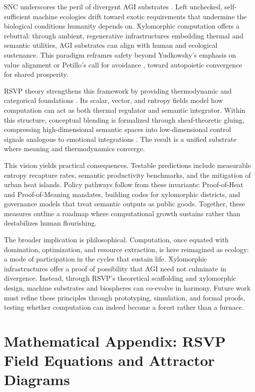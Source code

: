 \documentclass[12pt]{article}
\begin{document}
SNC underscores the peril of divergent AGI substrates \citep{Petillo2024}. Left unchecked, self-sufficient machine ecologies drift toward exotic requirements that undermine the biological conditions humanity depends on. Xylomorphic computation offers a rebuttal: through ambient, regenerative infrastructures embedding thermal and semantic utilities, AGI substrates can align with human and ecological sustenance. This paradigm reframes safety beyond Yudkowsky's emphasis on value alignment \citep{Yudkowsky2004} or Petillo's call for avoidance \citep{Petillo2024}, toward autopoietic convergence for shared prosperity.

RSVP theory strengthens this framework by providing thermodynamic and categorical foundations \citep{Jacobson1995,Padmanabhan2010,Verlinde2011,MacLaneMoerdijk1992,Lurie2009}. Its scalar, vector, and entropy fields model how computation can act as both thermal regulator and semantic integrator. Within this structure, conceptual blending is formalized through sheaf-theoretic gluing, compressing high-dimensional semantic spaces into low-dimensional control signals analogous to emotional integrations \citep{FauconnierTurner2002,Pessoa2017}. The result is a unified substrate where meaning and thermodynamics converge.

This vision yields practical consequences. Testable predictions include measurable entropy recapture rates, semantic productivity benchmarks, and the mitigation of urban heat islands. Policy pathways follow from these invariants: Proof-of-Heat and Proof-of-Meaning mandates, building codes for xylomorphic districts, and governance models that treat semantic outputs as public goods. Together, these measures outline a roadmap where computational growth sustains rather than destabilizes human flourishing.

The broader implication is philosophical. Computation, once equated with domination, optimization, and resource extraction, is here reimagined as ecology: a mode of participation in the cycles that sustain life. Xylomorphic infrastructures offer a proof of possibility that AGI need not culminate in divergence. Instead, through RSVP’s theoretical scaffolding and xylomorphic design, machine substrates and biospheres can co-evolve in harmony. Future work must refine these principles through prototyping, simulation, and formal proofs, testing whether computation can indeed become a forest rather than a furnace.

\appendix

\section{Mathematical Appendix: RSVP Field Equations and Attractor Diagrams}
\end{document}
